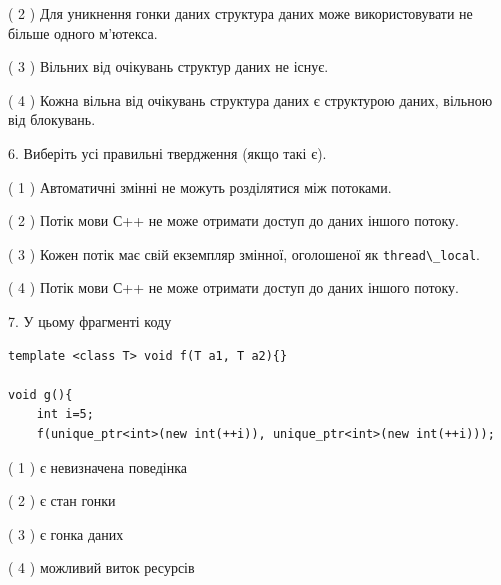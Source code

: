 \documentclass[12pt, ukrainian]{article}
\def\code#1{\Verb!#1!}
\begin{document}
\begin {large}
{( 2 ) Для уникнення гонки даних структура даних може використовувати не більше одного м’ютекса.%

( 3 ) Вільних від очікувань структур даних не існує.%

( 4 ) Кожна вільна від очікувань структура даних є структурою даних, вільною від блокувань.%
\newpage



\vspace{5mm}
6. Виберіть усі правильні твердження (якщо такі є).\par
\vspace{2mm}

( 1 ) Автоматичні змінні не можуть розділятися між потоками.%

( 2 ) Потік мови С++ не може отримати доступ до даних іншого потоку.%

( 3 ) Кожен потік має свій екземпляр змінної, оголошеної як \code{thread\_local}.%

( 4 ) Потік мови С++ не може отримати доступ до даних іншого потоку.%


\vspace{5mm}
7. У цьому фрагменті коду
\begin{verbatim}
template <class T> void f(T a1, T a2){}

void g(){
    int i=5;
    f(unique_ptr<int>(new int(++i)), unique_ptr<int>(new int(++i)));
\end{verbatim}

( 1 ) є невизначена поведінка%

( 2 ) є стан гонки%

( 3 ) є гонка даних%

( 4 ) можливий виток ресурсів%
}
\end {large}
\end{document}
